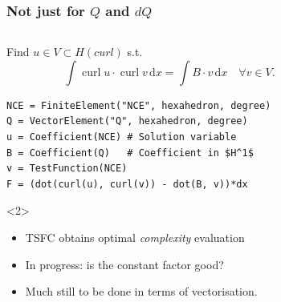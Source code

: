 \documentclass[presentation]{beamer}
\DeclareMathOperator{\curl}{curl}
\begin{document}
\begin{frame}[fragile]
  \frametitle{Not just for $Q$ and $dQ$}
  \begin{columns}
    \begin{column}{0.5\textwidth}
      \begin{block}{}
        Find $u \in V \subset H(curl)$ s.t.
        {\scriptsize \begin{equation*}
          \int\!\!\curl u \cdot \curl v \,\text{d}x = \int\!\!B\cdot
          v\,\text{d}x \quad \forall v \in V.
        \end{equation*}}
\begin{verbatim}
NCE = FiniteElement("NCE", hexahedron, degree)
Q = VectorElement("Q", hexahedron, degree)
u = Coefficient(NCE) # Solution variable
B = Coefficient(Q)   # Coefficient in $H^1$
v = TestFunction(NCE)
F = (dot(curl(u), curl(v)) - dot(B, v))*dx
\end{verbatim}
    \end{block}
    {\fontsize{9}{9}\selectfont
      \begin{uncoverenv}<2>
        \begin{itemize}
        \item TSFC obtains optimal \emph{complexity} evaluation
        \item In progress: is the constant factor good?
        \item Much still to be done in terms of vectorisation.
        \end{itemize}
      \end{uncoverenv}
      }
    \end{column}
  \begin{column}{0.6\textwidth}
  \begin{center}
\end{center}
\end{column}
\end{columns}
\end{frame}
\end{document}
